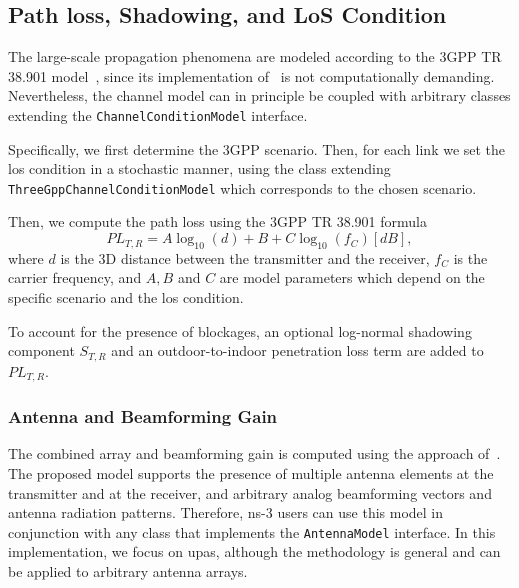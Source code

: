 \subsection{Path loss, Shadowing, and LoS Condition}
The large-scale propagation phenomena are modeled according to the 3GPP TR 38.901 model~\cite{TR38901}, since its implementation of~\cite{tommaso:20} is not computationally demanding. Nevertheless, the channel model can in principle be coupled with arbitrary classes extending the \texttt{Channel\-Condition\-Model} interface.

Specifically, we first determine the 3GPP scenario. Then, for each link we set the \gls{los} condition in a stochastic manner, using the class extending \texttt{Three\-Gpp\-Channel\-Condition\-Model} which corresponds to the chosen scenario.

Then, we compute the path loss using the 3GPP TR 38.901 formula
\begin{equation}
    PL_{T, R} = A \log_{10} (d) + B + C \log_{10} (f_C) [dB],
\end{equation}
where $d$ is the 3D distance between the transmitter and the receiver, $f_C$ is the carrier frequency, and  $A, B$ and $C$ are model parameters which depend on the specific scenario and the \gls{los} condition.

To account for the presence of blockages, an optional log-normal shadowing component $S_{T, R}$ and an outdoor-to-indoor penetration loss term are added to $PL_{T, R}$.

\subsubsection{Antenna and Beamforming Gain}



The combined array and beamforming gain is computed using the approach of~\cite{8422746}. 
The proposed model supports the presence of multiple antenna elements at the transmitter and at the receiver, and arbitrary analog beamforming vectors and antenna radiation patterns. Therefore, ns-3 users can use this model in conjunction with any class that implements the \texttt{AntennaModel} interface.
In this implementation, we focus on \glspl{upa}, although the methodology is general and can be applied to arbitrary antenna arrays.

